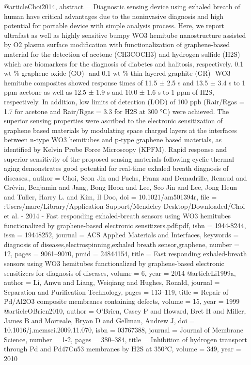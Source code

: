 @article{Choi2014,
abstract = {Diagnostic sensing device using exhaled breath of human have critical advantages due to the noninvasive diagnosis and high potential for portable device with simple analysis process. Here, we report ultrafast as well as highly sensitive bumpy WO3 hemitube nanostructure assisted by O2 plasma surface modification with functionalization of graphene-based material for the detection of acetone (CH3COCH3) and hydrogen sulfide (H2S) which are biomarkers for the diagnosis of diabetes and halitosis, respectively. 0.1 wt {\%} graphene oxide (GO)- and 0.1 wt {\%} thin layered graphite (GR)- WO3 hemitube composites showed response times of 11.5 ± 2.5 s and 13.5 ± 3.4 s to 1 ppm acetone as well as 12.5 ± 1.9 s and 10.0 ± 1.6 s to 1 ppm of H2S, respectively. In addition, low limits of detection (LOD) of 100 ppb (Rair/Rgas = 1.7 for acetone and Rair/Rgas = 3.3 for H2S at 300 °C) were achieved. The superior sensing properties were ascribed to the electronic sensitization of graphene based materials by modulating space charged layers at the interfaces between n-type WO3 hemitubes and p-type graphene based materials, as identified by Kelvin Probe Force Microscopy (KPFM). Rapid response and superior sensitivity of the proposed sensing materials following cyclic thermal aging demonstrates good potential for real-time exhaled breath diagnosis of diseases.},
author = {Choi, Seon Jin and Fuchs, Franz and Demadrille, Renaud and Gr{\'{e}}vin, Benjamin and Jang, Bong Hoon and Lee, Seo Jin and Lee, Jong Heun and Tuller, Harry L. and Kim, Il Doo},
doi = {10.1021/am501394r},
file = {:Users/marc/Library/Application Support/Mendeley Desktop/Downloaded/Choi et al. - 2014 - Fast responding exhaled-breath sensors using WO3 hemitubes functionalized by graphene-based electronic sensitizers.pdf:pdf},
isbn = {1944-8244},
issn = {19448252},
journal = {ACS Applied Materials and Interfaces},
keywords = {diagnosis of diseases,electrospinning,exhaled breath sensor,graphene},
number = {12},
pages = {9061--9070},
pmid = {24844154},
title = {{Fast responding exhaled-breath sensors using WO3 hemitubes functionalized by graphene-based electronic sensitizers for diagnosis of diseases}},
volume = {6},
year = {2014}
}
@article{Li1999a,
author = {Li, Anwu and Liang, Weiqiang and Hughes, Ronald},
journal = {Separation and Purification Technology},
pages = {113--119},
title = {{Repair of Pd/Al2O3 composite membranes containing defects}},
volume = {15},
year = {1999}
}
@article{OBrien2010,
author = {O'Brien, Casey P and Howard, Bret H and Miller, James B and Morreale, Bryan D and Gellman, Andrew J},
doi = {10.1016/j.memsci.2009.11.070},
isbn = {03767388},
journal = {Journal of Membrane Science},
number = {1-2},
pages = {380--384},
title = {{Inhibition of hydrogen transport through Pd and Pd47Cu53 membranes by H2S at 350°C}},
volume = {349},
year = {2010}
}
